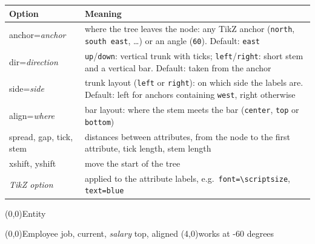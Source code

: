 \documentclass[10pt,a4paper]{article}
\newcommand\meta[1]{\textlangle\textit{#1}\textrangle}
\begin{document}
\begin{longtable}{@{}>{\ttfamily}p{3.6cm}p{12.2cm}@{}}
\toprule
\normalfont\textbf{Option} & \textbf{Meaning}\\\midrule
anchor=\meta{anchor} & where the tree leaves the node: any TikZ anchor
  (\texttt{north}, \texttt{south east}, \dots) or an angle
  (\texttt{60}). Default: \texttt{east}\\
dir=\meta{direction} & \texttt{up}/\texttt{down}: vertical trunk with
  ticks; \texttt{left}/\texttt{right}: short stem and a vertical bar.
  Default: taken from the anchor\\
side=\meta{side} & trunk layout (\texttt{left} or \texttt{right}): on which side the labels are. Default:
  left for anchors containing \texttt{west}, right otherwise\\
align=\meta{where} & bar layout: where the stem meets the bar
  (\texttt{center}, \texttt{top} or \texttt{bottom})\\
spread, gap, tick, stem & distances between attributes, from the node to
  the first attribute, tick length, stem length\\
xshift, yshift & move the start of the tree\\
\meta{TikZ option} & applied to the attribute labels, e.g.\
  \texttt{font=\textbackslash scriptsize}, \texttt{text=blue}\\
\bottomrule
\end{longtable}

\begin{example}
\begin{erdiagram}
  (0,0){Entity}
\end{erdiagram}
\end{example}

\begin{example}
\begin{erdiagram}
  (0,0){Employee}
    {{job, current}, \textit{salary}}
    {top, aligned}
  (4,0){works}
    {at -60 degrees}
\end{erdiagram}
\end{example}
\end{document}
